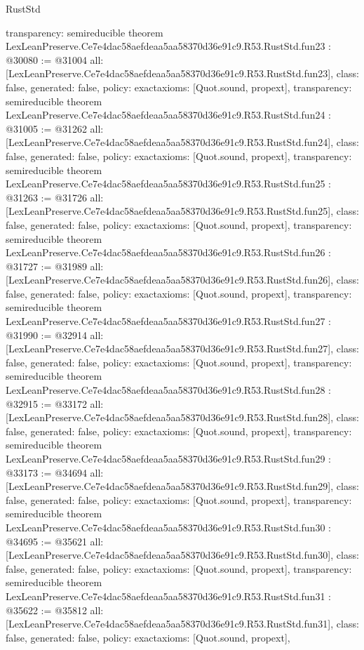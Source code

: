 \begin{lexlean}{RustStd}
\begin{coremodule}
{  transparency: semireducible
}
theorem LexLeanPreserve.Ce7e4dac58aefdeaa5aa58370d36e91c9.R53.RustStd.fun23 : @30080 := @31004 {
  all: [LexLeanPreserve.Ce7e4dac58aefdeaa5aa58370d36e91c9.R53.RustStd.fun23],
  class: false,
  generated: false,
  policy: exact{axioms: [Quot.sound, propext]},
  transparency: semireducible
}
theorem LexLeanPreserve.Ce7e4dac58aefdeaa5aa58370d36e91c9.R53.RustStd.fun24 : @31005 := @31262 {
  all: [LexLeanPreserve.Ce7e4dac58aefdeaa5aa58370d36e91c9.R53.RustStd.fun24],
  class: false,
  generated: false,
  policy: exact{axioms: [Quot.sound, propext]},
  transparency: semireducible
}
theorem LexLeanPreserve.Ce7e4dac58aefdeaa5aa58370d36e91c9.R53.RustStd.fun25 : @31263 := @31726 {
  all: [LexLeanPreserve.Ce7e4dac58aefdeaa5aa58370d36e91c9.R53.RustStd.fun25],
  class: false,
  generated: false,
  policy: exact{axioms: [Quot.sound, propext]},
  transparency: semireducible
}
theorem LexLeanPreserve.Ce7e4dac58aefdeaa5aa58370d36e91c9.R53.RustStd.fun26 : @31727 := @31989 {
  all: [LexLeanPreserve.Ce7e4dac58aefdeaa5aa58370d36e91c9.R53.RustStd.fun26],
  class: false,
  generated: false,
  policy: exact{axioms: [Quot.sound, propext]},
  transparency: semireducible
}
theorem LexLeanPreserve.Ce7e4dac58aefdeaa5aa58370d36e91c9.R53.RustStd.fun27 : @31990 := @32914 {
  all: [LexLeanPreserve.Ce7e4dac58aefdeaa5aa58370d36e91c9.R53.RustStd.fun27],
  class: false,
  generated: false,
  policy: exact{axioms: [Quot.sound, propext]},
  transparency: semireducible
}
theorem LexLeanPreserve.Ce7e4dac58aefdeaa5aa58370d36e91c9.R53.RustStd.fun28 : @32915 := @33172 {
  all: [LexLeanPreserve.Ce7e4dac58aefdeaa5aa58370d36e91c9.R53.RustStd.fun28],
  class: false,
  generated: false,
  policy: exact{axioms: [Quot.sound, propext]},
  transparency: semireducible
}
theorem LexLeanPreserve.Ce7e4dac58aefdeaa5aa58370d36e91c9.R53.RustStd.fun29 : @33173 := @34694 {
  all: [LexLeanPreserve.Ce7e4dac58aefdeaa5aa58370d36e91c9.R53.RustStd.fun29],
  class: false,
  generated: false,
  policy: exact{axioms: [Quot.sound, propext]},
  transparency: semireducible
}
theorem LexLeanPreserve.Ce7e4dac58aefdeaa5aa58370d36e91c9.R53.RustStd.fun30 : @34695 := @35621 {
  all: [LexLeanPreserve.Ce7e4dac58aefdeaa5aa58370d36e91c9.R53.RustStd.fun30],
  class: false,
  generated: false,
  policy: exact{axioms: [Quot.sound, propext]},
  transparency: semireducible
}
theorem LexLeanPreserve.Ce7e4dac58aefdeaa5aa58370d36e91c9.R53.RustStd.fun31 : @35622 := @35812 {
  all: [LexLeanPreserve.Ce7e4dac58aefdeaa5aa58370d36e91c9.R53.RustStd.fun31],
  class: false,
  generated: false,
  policy: exact{axioms: [Quot.sound, propext]},
}
\end{coremodule}
\end{lexlean}
